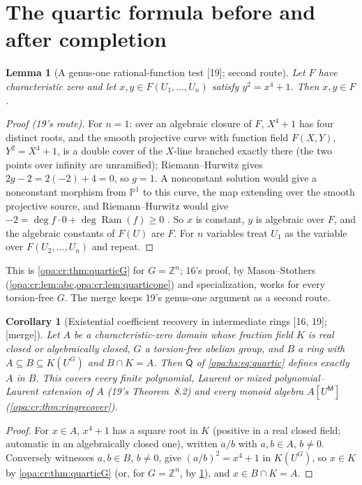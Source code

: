 \documentclass[11pt,oneside]{article}
\numberwithin{equation}{section}
\newtheorem{lemma}[lemma]{Lemma}
\newtheorem{corollary}[corollary]{Corollary}
\theoremstyle{definition}
\theoremstyle{remark}
\newcommand{\Z}{\mathbb Z}
\newcommand{\src}[1]{\textup{\textsf{\small[#1]}}}
\newcommand{\mergetag}{\textup{\textsf{\small[merge]}}}
\begin{document}
\section{The quartic formula before and after completion}\label{opa:hs:sec:quartic}

\begin{lemma}[A genus-one rational-function test \src{19}; second route]\label{opa:hs:lem:genus}
Let $F$ have characteristic zero and let $x,y\in F(U_1,\dots,U_n)$ satisfy $y^2=x^4+1$. Then $x,y\in F$.
\end{lemma}
\begin{proof}[Proof \textup{(19's route)}]
For $n=1$: over an algebraic closure of $F$, $X^4+1$ has four distinct roots, and the smooth projective curve with function field $F(X,Y)$,
$Y^2=X^4+1$, is a double cover of the $X$-line branched exactly there (the two points over infinity are unramified); Riemann--Hurwitz gives
$2g-2=2(-2)+4=0$, so $g=1$. A nonconstant solution would give a nonconstant morphism from $\mathbb P^1$ to this curve, the map extending over the
smooth projective source, and Riemann--Hurwitz would give $-2=\deg f\cdot0+\deg\operatorname{Ram}(f)\ge0$ \cite{StacksRH}. So $x$ is constant, $y$ is
algebraic over $F$, and the algebraic constants of $F(U)$ are $F$. For $n$ variables treat $U_1$ as the variable over $F(U_2,\dots,U_n)$ and repeat.
\end{proof}

This is \cref{opa:cr:thm:quarticG} for $G=\Z^n$; 16's proof, by Mason--Stothers (\cref{opa:cr:lem:abc,opa:cr:lem:quarticone}) and specialization, works
for every torsion-free $G$. The merge keeps 19's genus-one argument as a second route.

\begin{corollary}[Existential coefficient recovery in intermediate rings \src{16, 19}; \mergetag]\label{opa:hs:cor:intermediate}
Let $A$ be a characteristic-zero domain whose fraction field $K$ is real closed or algebraically closed, $G$ a torsion-free abelian group, and $B$ a
ring with $A\subseteq B\subseteq K(U^G)$ and $B\cap K=A$. Then $\mathsf Q$ of \eqref{opa:hs:eq:quartic} defines exactly $A$ in $B$. This covers every finite
polynomial, Laurent or mixed polynomial--Laurent extension of $A$ (19's Theorem~8.2) and every monoid algebra $A[U^{\mathsf M}]$
(\cref{opa:cr:thm:ringrecover}).
\end{corollary}
\begin{proof}
For $x\in A$, $x^4+1$ has a square root in $K$ (positive in a real closed field; automatic in an algebraically closed one), written $a/b$ with $a,b\in A$,
$b\ne0$. Conversely witnesses $a,b\in B$, $b\ne0$, give $(a/b)^2=x^4+1$ in $K(U^G)$, so $x\in K$ by \cref{opa:cr:thm:quarticG} (or, for $G=\Z^n$, by
\cref{opa:hs:lem:genus}), and $x\in B\cap K=A$.
\end{proof}
\end{document}
